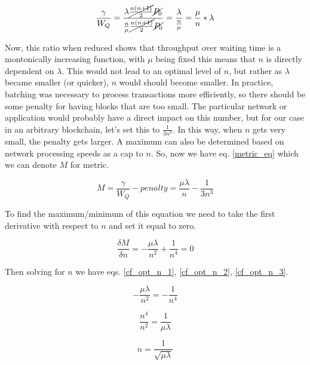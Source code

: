 \documentclass[conference]{IEEEtran}
\begin{document}
\begin{equation}
\frac{\gamma}{W_Q}=\frac{\lambda\cancel{\frac{n(n+1)}{2}}\cancel{P_0}}{\frac{n}{\mu}\cancel{\frac{n(n+1)}{2}}\cancel{P_0}}=\frac{\lambda}{\frac{n}{\mu}}=\frac{\mu}{n}\ast\lambda\label{ratio_eq}
\end{equation}

Now, this ratio when reduced shows that throughput over waiting time is a montonically increasing function, 
with $\mu$ being fixed this means that $n$ is directly dependent on $\lambda$. This would not lead to an optimal 
level of $n$, but rather as $\lambda$ became smaller (or quicker), $n$ would should become smaller. In practice, 
batching was necessary to process transactions more efficiently, so there should be some penalty for having blocks 
that are too small. The particular network or application would probably have a direct impact on this number, but
for our case in an arbitrary blockchain, let's set this to $\frac{1}{3n^3}$. In this way, when $n$ gets very small, 
the penalty gets larger. A maximum can also be determined based on network processing speeds as a cap to 
$n$. So, now we have eq. \ref{metric_eq} which we can denote $M$ for metric.

\begin{equation}
M=\frac{\gamma}{W_Q}-penalty=\frac{\mu\lambda}{n}-\frac{1}{3n^3}\label{metric_eq}
\end{equation}

To find the maximum/minimum of this equation we need to take the first derivative with respect to $n$ 
and set it equal to zero. 

\begin{equation}
\frac{\delta M}{\delta n}=-\frac{\mu\lambda}{n^2}+\frac{1}{n^4}=0\label{metric_deriv}
\end{equation}

Then solving for $n$ we have eqs. \ref{cf_opt_n_1}, \ref{cf_opt_n_2}, \ref{cf_opt_n_3}.

\begin{equation}
-\frac{\mu\lambda}{n^2}=-\frac{1}{n^4}\label{cf_opt_n_1}
\end{equation}

\begin{equation}
\frac{n^4}{n^2}=\frac{1}{\mu\lambda}\label{cf_opt_n_2}
\end{equation}

\begin{equation}
n=\frac{1}{\sqrt{\mu\lambda}}\label{cf_opt_n_3}
\end{equation}
\end{document}
